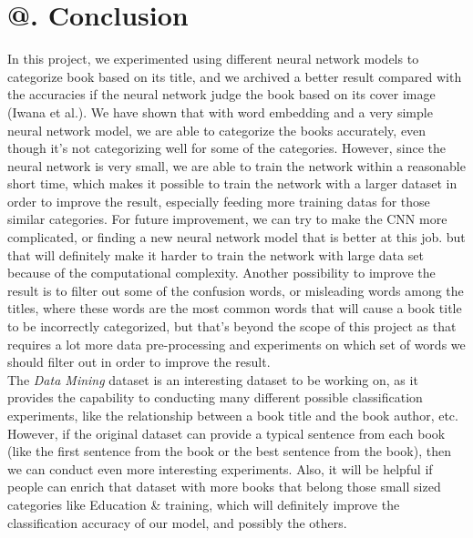 \documentclass[jou,apacite, 10px]{apa6}
\makeatletter
\newcommand*{\rom}[1]{\expandafter\@slowromancap\romannumeral #1@}
\makeatother
\begin{document}
\section{\rom{6}. Conclusion}
In this project, we experimented using different neural network models to categorize book based on its title, and we archived a better result compared with the accuracies if the neural network judge the book based on its cover image (Iwana et al.). We have shown that with word embedding and a very simple neural network model, we are able to categorize the books accurately, even though it's not categorizing well for some of the categories. However, since the neural network is very small, we are able to train the network within a reasonable short time, which makes it possible to train the network with a larger dataset in order to improve the result, especially feeding more training datas for those similar categories. For future improvement, we can try to make the CNN more complicated, or finding a new neural network model that is better at this job. but that will definitely make it harder to train the network with large data set because of the computational complexity. Another possibility to improve the result is to filter out some of the confusion words, or misleading words among the titles, where these words are the most common words that will cause a book title to be incorrectly categorized, but that's beyond the scope of this project as that requires a lot more data pre-processing and experiments on which set of words we should filter out in order to improve the result.\\

 The \textit{Data Mining} dataset is an interesting dataset to be working on, as it provides the capability to conducting many different possible classification experiments, like the relationship between a book title and the book author, etc. However, if the original dataset can provide a typical sentence from each book (like the first sentence from the book or the best sentence from the book), then we can conduct even more interesting experiments. Also, it will be helpful if people can enrich that dataset with more books that belong those small sized categories like Education \& training, which will definitely improve the classification accuracy of our model, and possibly the others.
\end{document}
